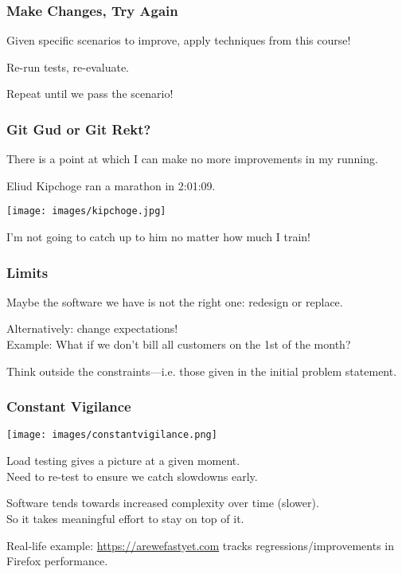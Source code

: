 \begin{frame}
\frametitle{Make Changes, Try Again}

Given specific scenarios to improve, apply techniques from this course!

Re-run tests, re-evaluate.

Repeat until we pass the scenario!

\end{frame}

\begin{frame}
\frametitle{Git Gud or Git Rekt?}

There is a point at which I can make no more improvements in my running.

Eliud Kipchoge ran a marathon in 2:01:09.\\
\begin{center}
  \texttt{[image: images/kipchoge.jpg]}
\end{center}

I'm not going to catch up to him no matter how much I train!

\end{frame}

\begin{frame}
\frametitle{Limits}

Maybe the software we have is not the right one: redesign or replace.

Alternatively: change expectations!\\
\quad Example: What if we don't bill all customers on the 1st of the month?

Think outside the constraints---i.e. those given in the initial problem statement.

\end{frame}

\begin{frame}
\frametitle{Constant Vigilance}

\begin{center}
  \texttt{[image: images/constantvigilance.png]}
\end{center}

Load testing gives a picture at a given moment.\\
\quad Need to re-test to ensure we catch slowdowns early.

Software tends towards increased complexity over time (slower).\\
\quad So it takes meaningful effort to stay on top of it.

Real-life example: \url{https://arewefastyet.com} tracks regressions/improvements in Firefox performance.

\end{frame}


